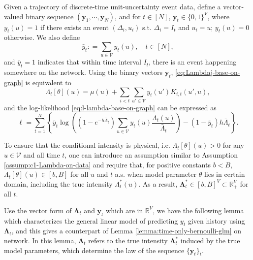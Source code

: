 \documentclass[11pt]{article}
\theoremstyle{remark}
\theoremstyle{plain}
\newcommand{\calV}{\mathcal{V}}
\newcommand{\R}{\mathbb{R}}
\begin{document}
Given a trajectory of discrete-time unit-uncertainty event data, define a vector-valued binary sequence $(\mathbf{y}_1, \cdots, \mathbf{y}_N)$, and for $t\in [N]$, $\mathbf{y}_t \in \{ 0,1 \}^V$, where
$y_t( u) = 1$ if there exists an event $(\Delta_i ,u_i)$  s.t. $\Delta_i = I_{t}$ and $u_i = u$;
$y_t( u) = 0$ otherwise. 
We also define 
\[
\bar{y}_t : = \sum_{u \in \calV} y_t(u), \quad t \in [N],  
\]
and $\bar{y}_t = 1$ indicates that within time interval $I_t$, there is an event happening somewhere on the network. 
%
Using the binary vectors $\mathbf{y}_t$, 
\eqref{eq:Lambdaj-base-on-graph} is equivalent to 
\begin{equation}\label{eq:Lambdaj-base-on-graph-bernoulli}
\Lambda_t [\theta] (u) = \mu(u) +  \sum_{ i < t}  \sum_{u' \in \calV } y_i(u')  K_{i, t}(u', u),
\end{equation}
and the log-likelihood \eqref{eq:l-lambda-base-on-graph} can be expressed as 
\begin{equation}\label{eq:l-lambda-base-on-graph-beroulli}
\ell 
= \sum_{t=1}^N \left\{ 
		\bar{y}_t \log \left(  (1- e^{- h \bar{\Lambda}_{t}} )  
					    \sum_{u \in \calV} y_t(u) \frac{ \Lambda_{t} (u) }{ \bar{\Lambda}_{t}} \right) 
		-   (1- \bar{y}_t)h \bar{\Lambda}_t \right\}.
\end{equation}



To ensure that the conditional intensity is physical, i.e. $\Lambda_t [\theta](u) > 0$ for any $u \in \calV$ and all time $t$, one can introduce an assumption similar to Assumption \ref{assump:c1-Lambda-on-data}
and require that, for positive constants $b < B$,
$\Lambda_t[\theta](u) \in [b,B]$ for all $u$ and $t$ a.s. when model parameter $\theta$ lies in certain domain,
including the true intensity $\Lambda_t^*(u)$.
As a result, $\mathbf{\Lambda}_t^* \in [b, B]^V \subset \R_+^V$ for all $t$.


Use the vector form of $\mathbf{\Lambda}_t$ and $\mathbf{y}_t$ which are in $\R^V$, we have the following lemma which characterizes the general linear model of predicting $y_t$ given history using $\mathbf{\Lambda}_t$, and this gives a counterpart of Lemma \ref{lemma:time-only-bernoulli-glm} on network.
In this lemma, $\mathbf{\Lambda}_t$ refers to the true intensity $\mathbf{\Lambda}_t^*$ induced by the true model parameters, which determine the law of the sequence $\{\mathbf{y}_t\}_t$.
\end{document}
